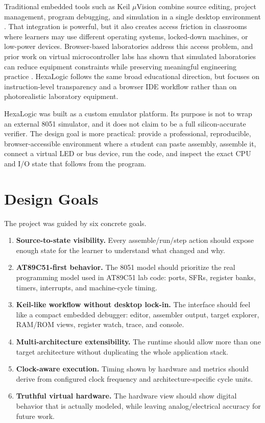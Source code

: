 \documentclass[conference]{IEEEtran}
\begin{document}
Traditional embedded tools such as Keil \(\mu\)Vision combine source editing, project management, program debugging, and simulation in a single desktop environment \cite{keil_uvision}. That integration is powerful, but it also creates access friction in classrooms where learners may use different operating systems, locked-down machines, or low-power devices. Browser-based laboratories address this access problem, and prior work on virtual microcontroller labs has shown that simulated laboratories can reduce equipment constraints while preserving meaningful engineering practice \cite{richardson_vle,choi_virtual_remote}. HexaLogic follows the same broad educational direction, but focuses on instruction-level transparency and a browser IDE workflow rather than on photorealistic laboratory equipment.

HexaLogic was built as a custom emulator platform. Its purpose is not to wrap an external 8051 simulator, and it does not claim to be a full silicon-accurate verifier. The design goal is more practical: provide a professional, reproducible, browser-accessible environment where a student can paste assembly, assemble it, connect a virtual LED or bus device, run the code, and inspect the exact CPU and I/O state that follows from the program.

\section{Design Goals}
The project was guided by six concrete goals.

\begin{enumerate}
\item \textbf{Source-to-state visibility.} Every assemble/run/step action should expose enough state for the learner to understand what changed and why.
\item \textbf{AT89C51-first behavior.} The 8051 model should prioritize the real programming model used in AT89C51 lab code: ports, SFRs, register banks, timers, interrupts, and machine-cycle timing.
\item \textbf{Keil-like workflow without desktop lock-in.} The interface should feel like a compact embedded debugger: editor, assembler output, target explorer, RAM/ROM views, register watch, trace, and console.
\item \textbf{Multi-architecture extensibility.} The runtime should allow more than one target architecture without duplicating the whole application stack.
\item \textbf{Clock-aware execution.} Timing shown by hardware and metrics should derive from configured clock frequency and architecture-specific cycle units.
\item \textbf{Truthful virtual hardware.} The hardware view should show digital behavior that is actually modeled, while leaving analog/electrical accuracy for future work.
\end{enumerate}
\end{document}
